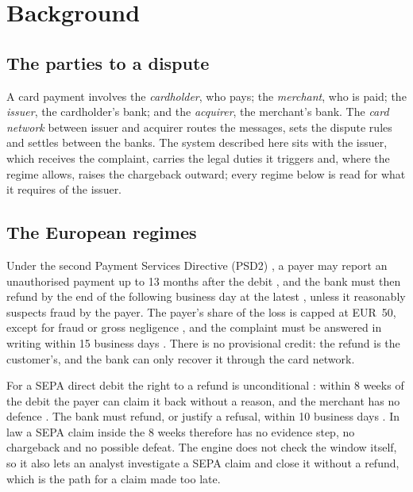 \chapter{Background}
\label{ch:background}


\section{The parties to a dispute}
\label{sec:bg-parties}

A card payment involves the \emph{cardholder}, who pays; the \emph{merchant}, who is paid; the
\emph{issuer}, the cardholder's bank; and the \emph{acquirer}, the merchant's bank. The \emph{card
network} between issuer and acquirer routes the messages, sets the dispute rules and settles
between the banks. The system described
here sits with the issuer, which receives the complaint, carries the legal duties it triggers and,
where the regime allows, raises the chargeback outward; every regime below is read for what it
requires of the issuer.

\section{The European regimes}
\label{sec:bg-eu}

Under the second Payment Services Directive (PSD2) \cite{psd2}, a payer may report an
unauthorised payment up to 13 months after the debit \cite[art.~71(1)]{psd2}, and the bank
must then refund by the end of the following business day at the latest \cite[art.~73(1)]{psd2}, unless it reasonably suspects
fraud by the payer. The payer's share of the loss is capped at EUR~50, except for fraud or
gross negligence \cite[art.~74(1)]{psd2}, and the complaint must be answered in writing within
15 business days \cite[art.~101(2)]{psd2}. There is no provisional credit: the refund is the
customer's, and the bank can only recover it through the card network.

For a SEPA direct debit the right to a refund is unconditional \cite[art.~76(1)]{psd2}: within
8 weeks of the debit \cite[art.~77(1)]{psd2} the payer can claim it back without a reason, and
the merchant has no defence \cite{sepacore}. The bank must refund, or justify a refusal, within
10 business days \cite[art.~77(2)]{psd2}. In law a SEPA claim inside the 8 weeks therefore has
no evidence step, no chargeback and no possible defeat. The engine does not check the window
itself, so it also lets an analyst investigate a SEPA claim and close it without a refund, which
is the path for a claim made too late.

